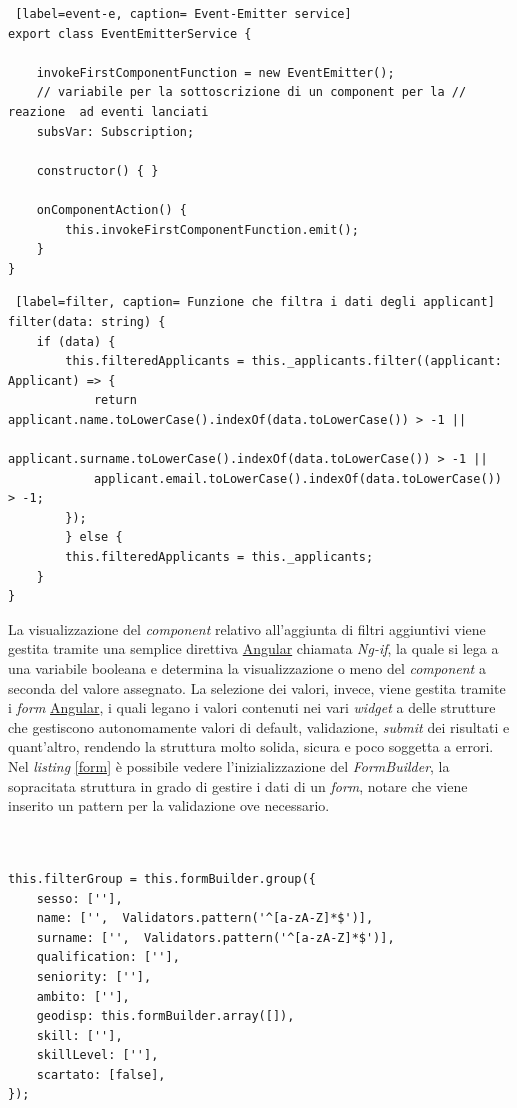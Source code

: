 \begin{lstlisting} [label=event-e, caption= Event-Emitter service]
export class EventEmitterService {

	invokeFirstComponentFunction = new EventEmitter();
	// variabile per la sottoscrizione di un component per la // reazione  ad eventi lanciati
	subsVar: Subscription;

	constructor() { }

	onComponentAction() {
		this.invokeFirstComponentFunction.emit();
	}
}
\end{lstlisting}

\begin{lstlisting} [label=filter, caption= Funzione che filtra i dati degli applicant]
filter(data: string) {
	if (data) {
		this.filteredApplicants = this._applicants.filter((applicant: Applicant) => {
			return applicant.name.toLowerCase().indexOf(data.toLowerCase()) > -1 ||
			applicant.surname.toLowerCase().indexOf(data.toLowerCase()) > -1 ||
			applicant.email.toLowerCase().indexOf(data.toLowerCase()) > -1;
		});
		} else {
		this.filteredApplicants = this._applicants;
	}
}

\end{lstlisting}

La visualizzazione del \textit{component} relativo all'aggiunta di filtri aggiuntivi viene gestita tramite una semplice direttiva \hyperref[angular]{Angular} chiamata \textit{Ng-if}, la quale si lega a una variabile booleana e determina la visualizzazione o meno del \textit{component} a seconda del valore assegnato. La selezione dei valori, invece, viene gestita tramite i \textit{form} \hyperref[angular]{Angular}, i quali legano i valori contenuti nei vari \textit{widget} a delle strutture che gestiscono autonomamente valori di default, validazione, \textit{submit} dei risultati e quant'altro, rendendo la struttura molto solida, sicura e poco soggetta a errori.
Nel \textit{listing} \ref{form} è possibile vedere l'inizializzazione del \textit{FormBuilder}, la sopracitata struttura in grado di gestire i dati di un \textit{form}, notare che viene inserito un pattern per la validazione ove necessario.
\newpage
\begin{lstlisting}[label= form, caption= Inizializzazione di un FormBuilder]


this.filterGroup = this.formBuilder.group({
	sesso: [''],
	name: ['',  Validators.pattern('^[a-zA-Z]*$')],
	surname: ['',  Validators.pattern('^[a-zA-Z]*$')],
	qualification: [''],
	seniority: [''],
	ambito: [''],
	geodisp: this.formBuilder.array([]),
	skill: [''],
	skillLevel: [''],
	scartato: [false],
});

\end{lstlisting}

